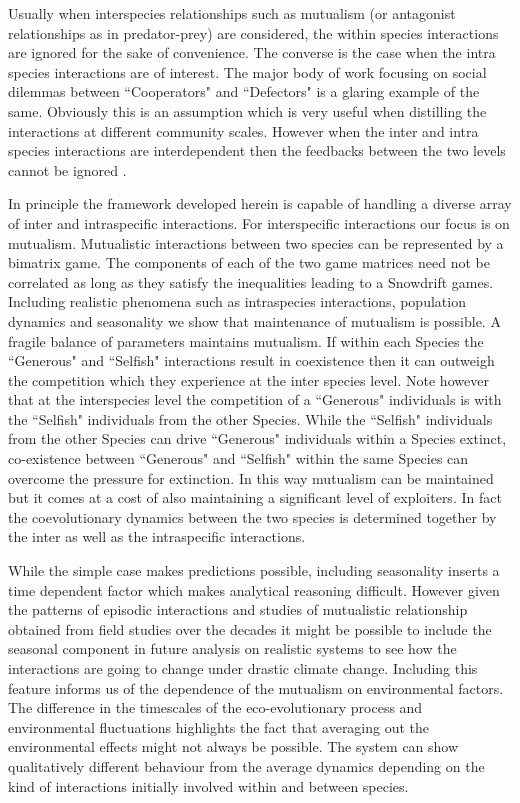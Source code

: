 \documentclass[12pt]{article}
\begin{document}
Usually when interspecies relationships such as mutualism (or antagonist relationships as in predator-prey) are considered, the within species interactions are ignored for the sake of convenience. 
The converse is the case when the intra species interactions are of interest.
The major body of work focusing on social dilemmas between ``Cooperators" and ``Defectors" is a glaring example of the same.
Obviously this is an assumption which is very useful when distilling the interactions at different community scales.
However when the inter and intra species interactions are interdependent then the feedbacks between the two levels cannot be ignored \citep{schluter:PlosB:2012}.

In principle the framework developed herein is capable of handling a diverse array of inter and intraspecific interactions.
For interspecific interactions our focus is on mutualism.
Mutualistic interactions between two species can be represented by a bimatrix game. 
The components of each of the two game matrices need not be correlated as long as they satisfy the inequalities leading to a Snowdrift games.
Including realistic phenomena such as intraspecies interactions, population dynamics and seasonality we show that maintenance of mutualism is possible.
A fragile balance of parameters maintains mutualism.
If within each Species the ``Generous" and ``Selfish" interactions result in coexistence then it can outweigh the competition which they experience at the inter species level.
Note however that at the interspecies level the competition of a ``Generous" individuals is with the ``Selfish" individuals from the other Species.
While the ``Selfish" individuals from the other Species can drive ``Generous" individuals within a Species extinct, co-existence between ``Generous" and ``Selfish" within the same Species can overcome the pressure for extinction.
In this way mutualism can be maintained but it comes at a cost of also maintaining a significant level of exploiters.
In fact the coevolutionary dynamics between the two species is determined together by the inter as well as the intraspecific interactions.

While the simple case makes predictions possible, including seasonality inserts a time dependent factor which makes analytical reasoning difficult.
However given the patterns of episodic interactions and studies of mutualistic relationship obtained from field studies over the decades it might be possible to include the seasonal component in future analysis on realistic systems to see how the interactions are going to change under drastic climate change.
Including this feature informs us of the dependence of the mutualism on environmental factors.
The difference in the timescales of the eco-evolutionary process and environmental fluctuations highlights the fact that averaging out the environmental effects might not always be possible.
The system can show qualitatively different behaviour from the average dynamics depending on the kind of interactions initially involved within and between species.
 
\end{document}
